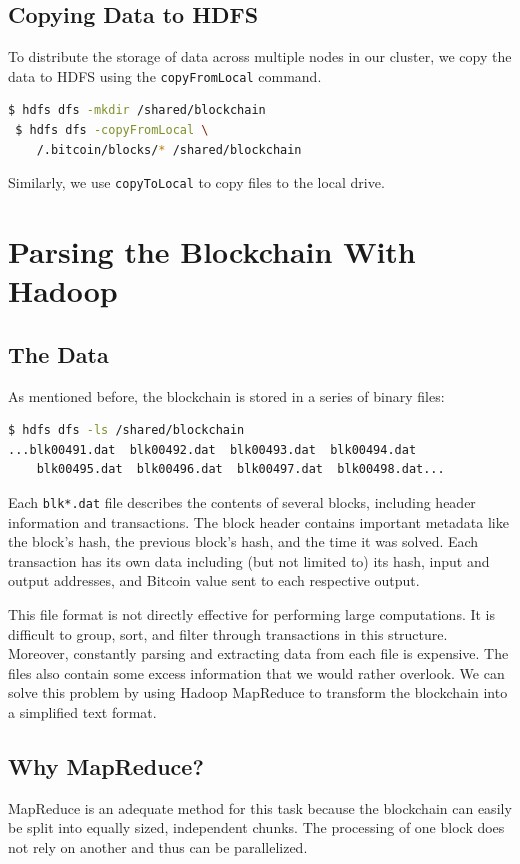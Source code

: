 \documentclass[9pt,twocolumn,twoside]{idsi}
\begin{document}
\subsection{Copying Data to HDFS}

To distribute the storage of data across multiple nodes in our cluster, we copy the data to HDFS using the \lstinline{copyFromLocal} command.

\begin{lstlisting}[language=bash]
 $ hdfs dfs -mkdir /shared/blockchain
 $ hdfs dfs -copyFromLocal \
    /.bitcoin/blocks/* /shared/blockchain
\end{lstlisting}

Similarly, we use \lstinline{copyToLocal} to copy files to the local drive.

\section{Parsing the Blockchain With Hadoop}
\subsection{The Data}
As mentioned before, the blockchain is stored in a series of binary files:
\begin{lstlisting}[language=bash]
 $ hdfs dfs -ls /shared/blockchain
...blk00491.dat  blk00492.dat  blk00493.dat  blk00494.dat
    blk00495.dat  blk00496.dat  blk00497.dat  blk00498.dat...
\end{lstlisting}

Each \lstinline{blk*.dat} file describes the contents of several blocks, including header information and transactions. The block header contains important metadata like the block's hash, the previous block's hash, and the time it was solved. Each transaction has its own data including (but not limited to) its hash, input and output addresses, and Bitcoin value sent to each respective output.

This file format is not directly effective for performing large computations. It is difficult to group, sort, and filter through transactions in this structure. Moreover, constantly parsing and extracting data from each file is expensive. The files also contain some excess information that we would rather overlook. We can solve this problem by using Hadoop MapReduce to transform the blockchain into a simplified text format.

\subsection{Why MapReduce?}
MapReduce is an adequate method for this task because the blockchain can easily be split into equally sized, independent chunks. The processing of one block does not rely on another and thus can be parallelized.
\end{document}

